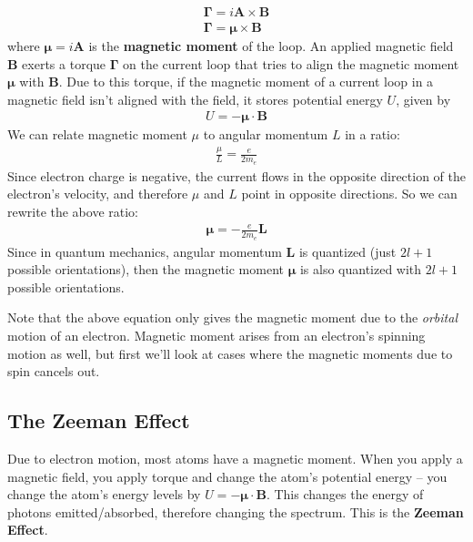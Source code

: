 \documentclass[10pt]{article}
\begin{document}
\begin{align}
    \mathbf{\Gamma} = i\mathbf{A} \times \mathbf{B} \\
    \mathbf{\Gamma} = \boldsymbol{\mu} \times \mathbf{B}
\end{align}
where $\boldsymbol{\mu} = i \mathbf{A}$ is the \textbf{magnetic moment} of the loop. An applied magnetic field $\mathbf{B}$ exerts a torque $\mathbf{\Gamma}$ on the current loop that tries to align the magnetic moment $\boldsymbol{\mu}$ with $\mathbf{B}$. Due to this torque, if the magnetic moment of a current loop in a magnetic field isn't aligned with the field, it stores potential energy $U$, given by
\begin{align}
    U = -\boldsymbol{\mu} \cdot \mathbf{B}
\end{align}
We can relate magnetic moment $\mu$ to angular momentum $L$ in a ratio:  
\begin{align}
    \frac{\mu}{L} = \frac{e}{2m_e}    
\end{align}
Since electron charge is negative, the current flows in the opposite direction of the electron's velocity, and therefore $\mu$ and $L$ point in opposite directions. So we can rewrite the above ratio:
\begin{align}
    \boldsymbol{\mu} = -\frac{e}{2m_e} \mathbf{L}
\end{align}
Since in quantum mechanics, angular momentum $\mathbf{L}$ is quantized (just $2l+1$ possible orientations), then the magnetic moment $\boldsymbol{\mu}$ is also quantized with $2l + 1$ possible orientations.

Note that the above equation only gives the magnetic moment due to the \textit{orbital} motion of an electron. Magnetic moment arises from an electron's spinning motion as well, but first we'll look at cases where the magnetic moments due to spin cancels out.



\subsection{The Zeeman Effect}
Due to electron motion, most atoms have a magnetic moment. When you apply a magnetic field, you apply torque and change the atom's potential energy -- you change the atom's energy levels by $U = -\boldsymbol{\mu} \cdot \mathbf{B}$. This changes the energy of photons emitted/absorbed, therefore changing the spectrum. This is the \textbf{Zeeman Effect}.
\end{document}

